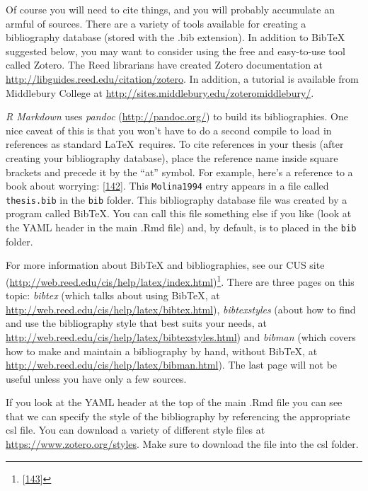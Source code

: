 \documentclass[12pt,twoside]{reedthesis}
\begin{document}
  Of course you will need to cite things, and you will probably accumulate
  an armful of sources. There are a variety of tools available for
  creating a bibliography database (stored with the .bib extension). In
  addition to BibTeX suggested below, you may want to consider using the
  free and easy-to-use tool called Zotero. The Reed librarians have
  created Zotero documentation at
  \url{http://libguides.reed.edu/citation/zotero}. In addition, a tutorial
  is available from Middlebury College at
  \url{http://sites.middlebury.edu/zoteromiddlebury/}.
  
  \emph{R Markdown} uses \emph{pandoc} (\url{http://pandoc.org/}) to build
  its bibliographies. One nice caveat of this is that you won't have to do
  a second compile to load in references as standard \LaTeX~requires. To
  cite references in your thesis (after creating your bibliography
  database), place the reference name inside square brackets and precede
  it by the ``at'' symbol. For example, here's a reference to a book about
  worrying: {[}\protect\hyperlink{ref-Molina1994}{142}{]}. This
  \texttt{Molina1994} entry appears in a file called \texttt{thesis.bib}
  in the \texttt{bib} folder. This bibliography database file was created
  by a program called BibTeX. You can call this file something else if you
  like (look at the YAML header in the main .Rmd file) and, by default, is
  to placed in the \texttt{bib} folder.
  
  For more information about BibTeX and bibliographies, see our CUS site
  (\url{http://web.reed.edu/cis/help/latex/index.html})\footnote{{[}\protect\hyperlink{ref-reedweb2007}{143}{]}}.
  There are three pages on this topic: \emph{bibtex} (which talks about
  using BibTeX, at \url{http://web.reed.edu/cis/help/latex/bibtex.html}),
  \emph{bibtexstyles} (about how to find and use the bibliography style
  that best suits your needs, at
  \url{http://web.reed.edu/cis/help/latex/bibtexstyles.html}) and
  \emph{bibman} (which covers how to make and maintain a bibliography by
  hand, without BibTeX, at
  \url{http://web.reed.edu/cis/help/latex/bibman.html}). The last page
  will not be useful unless you have only a few sources.
  
  If you look at the YAML header at the top of the main .Rmd file you can
  see that we can specify the style of the bibliography by referencing the
  appropriate csl file. You can download a variety of different style
  files at \url{https://www.zotero.org/styles}. Make sure to download the
  file into the csl folder.
  
\end{document}
